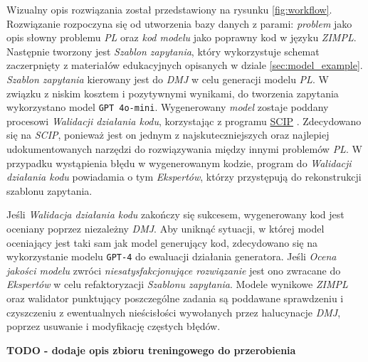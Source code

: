 Wizualny opis rozwiązania został przedstawiony na rysunku \ref{fig:workflow}. %
Rozwiązanie rozpoczyna się od utworzenia bazy danych z parami: \textit{problem} jako opis słowny problemu \textit{PL} oraz \textit{kod modelu} jako poprawny kod w języku \textit{ZIMPL}. Następnie tworzony jest \textit{Szablon zapytania}, który wykorzystuje schemat zaczerpnięty z materiałów edukacyjnych opisanych w dziale \ref{sec:model_example}. \textit{Szablon zapytania} kierowany jest do \textit{DMJ} w celu generacji modelu \textit{PL}. W związku z niskim kosztem i pozytywnymi wynikami, do tworzenia zapytania wykorzystano model \texttt{GPT 4o-mini}. Wygenerowany \textit{model} zostaje poddany procesowi \textit{Walidacji działania kodu}, korzystając z programu \href{https://www.scipopt.org/}{SCIP} \cite{TODO}. %
 Zdecydowano się na \textit{SCIP}, ponieważ jest on jednym z najskuteczniejszych oraz najlepiej udokumentowanych narzędzi do rozwiązywania między innymi problemów \textit{PL}. %
 W przypadku wystąpienia błędu w wygenerowanym kodzie, program do \textit{Walidacji działania kodu} powiadamia o tym \textit{Ekspertów}, którzy przystępują do rekonstrukcji szablonu zapytania.

Jeśli \textit{Walidacja działania kodu} zakończy się sukcesem, wygenerowany kod jest oceniany poprzez niezależny \textit{DMJ}. Aby uniknąć sytuacji, w której model oceniający jest taki sam jak model generujący kod, zdecydowano się na wykorzystanie modelu \texttt{GPT-4} do ewaluacji działania generatora. Jeśli \textit{Ocena jakości modelu} zwróci \textit{niesatysfakcjonujące rozwiązanie} jest ono zwracane do \textit{Ekspertów} w celu refaktoryzacji \textit{Szablonu zapytania}. Modele wynikowe \textit{ZIMPL} oraz walidator punktujący poszczególne zadania są poddawane sprawdzeniu i czyszczeniu z ewentualnych nieścisłości wywołanych przez halucynacje \textit{DMJ}, poprzez usuwanie i modyfikację częstych błędów.


\textbf{TODO - dodaje opis zbioru treningowego do przerobienia}

